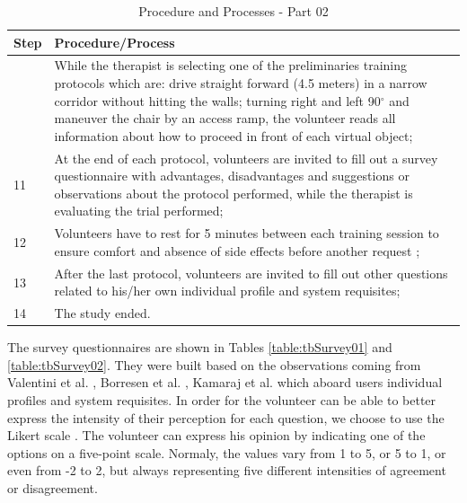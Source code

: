 \begin{table}[!hbt]
\caption{Procedure and Processes - Part 02}\label{table:tbProcedure02}
\centering
\begin{tabular}{ >{\centering}m{0.5cm}  >{}m{14.5cm} }
\toprule
Step & Procedure/Process \\
\midrule
10 &  While the therapist is selecting one of the preliminaries training protocols which are: drive straight forward (4.5 meters) in a narrow corridor without hitting the walls; turning right and left 90$^{\circ}$ and maneuver the chair by an access ramp, the volunteer reads all information about how to proceed in front of each virtual object; \\ \cline{2-2}
11 &  At the end of each protocol, volunteers are invited to fill out a survey questionnaire with advantages, disadvantages and suggestions or observations about the protocol performed, while the therapist is evaluating the trial performed;  \\ \cline{2-2}
12 &  Volunteers have to rest for 5 minutes between each training session to ensure comfort and absence of side effects before another request \cite{lanata2014}; \\ \cline{2-2}
13 &  After the last protocol, volunteers are invited to fill out other questions related to his/her own individual profile and system requisites; \\ \cline{2-2}
14 &  The study ended. \\ 
\bottomrule
\end{tabular}
\end{table}

The survey questionnaires are shown in Tables \ref{table:tbSurvey01} and \ref{table:tbSurvey02}. They were built based on the observations coming from Valentini et al. \cite{valentini2019},  Borresen et al. \cite{borresen2019}, Kamaraj et al. \cite{kamaraj2016}  which aboard users individual profiles and system requisites. In order for the volunteer can be able to better express the intensity of their perception for each question, we choose to use the Likert scale \cite{likert1932}. The volunteer can express his opinion by indicating one of the options on a five-point scale. Normaly, the values vary from 1 to 5, or 5 to 1, or even from -2 to 2, but always representing five different intensities of agreement or disagreement.

